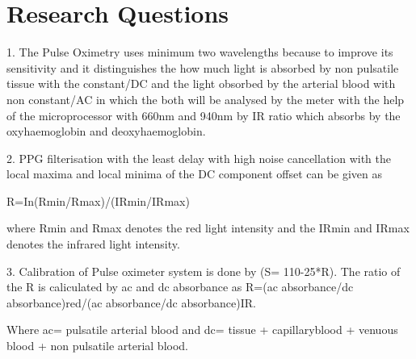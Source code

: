





\section{Research Questions}

1. The Pulse Oximetry uses minimum two wavelengths because to improve its sensitivity and it distinguishes the how much light is absorbed by non pulsatile tissue with the constant/DC and the light obsorbed by the arterial blood with non constant/AC in which the both will be analysed by the meter with the help of the microprocessor with 660nm and 940nm by IR ratio which absorbs by the oxyhaemoglobin and deoxyhaemoglobin.

2. PPG filterisation with the least delay with high noise cancellation with the local maxima and local minima of the DC component offset can be given as 
\begin{center}
R=In(Rmin/Rmax)/(IRmin/IRmax)
\end{center}
where Rmin and Rmax denotes the red light intensity and the IRmin and IRmax denotes the infrared light intensity.

3. Calibration of Pulse oximeter system is done by (S= 110-25*R). The ratio of the R is caliculated by ac and dc absorbance as R=(ac absorbance/dc absorbance)red/(ac absorbance/dc absorbance)IR.

Where ac= pulsatile arterial blood and dc= tissue + capillaryblood + venuous blood + non pulsatile arterial blood.



